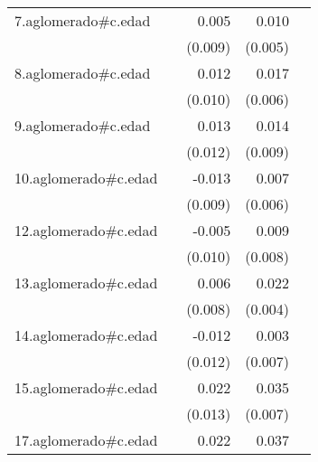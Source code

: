 {\begin{longtable}{l*{4}{D{.}{.}{-1}}}
\addlinespace
7.aglomerado#c.edad&                     &       0.005         &       0.010         &                     \\
            &                     &     (0.009)         &     (0.005)         &                     \\
\addlinespace
8.aglomerado#c.edad&                     &       0.012         &       0.017\sym{**} &                     \\
            &                     &     (0.010)         &     (0.006)         &                     \\
\addlinespace
9.aglomerado#c.edad&                     &       0.013         &       0.014         &                     \\
            &                     &     (0.012)         &     (0.009)         &                     \\
\addlinespace
10.aglomerado#c.edad&                     &      -0.013         &       0.007         &                     \\
            &                     &     (0.009)         &     (0.006)         &                     \\
\addlinespace
12.aglomerado#c.edad&                     &      -0.005         &       0.009         &                     \\
            &                     &     (0.010)         &     (0.008)         &                     \\
\addlinespace
13.aglomerado#c.edad&                     &       0.006         &       0.022\sym{***}&                     \\
            &                     &     (0.008)         &     (0.004)         &                     \\
\addlinespace
14.aglomerado#c.edad&                     &      -0.012         &       0.003         &                     \\
            &                     &     (0.012)         &     (0.007)         &                     \\
\addlinespace
15.aglomerado#c.edad&                     &       0.022         &       0.035\sym{***}&                     \\
            &                     &     (0.013)         &     (0.007)         &                     \\
\addlinespace
17.aglomerado#c.edad&                     &       0.022         &       0.037\sym{**} &                     \\

\end{longtable}}
